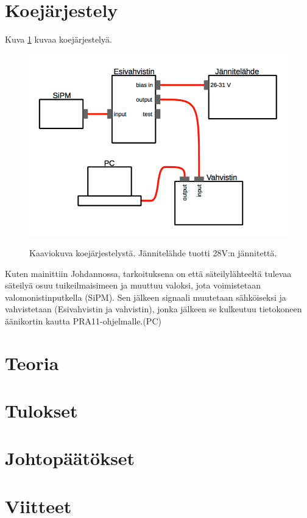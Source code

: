 \documentclass[a4paper, 12pt]{article}
\begin{document}
\section{Koejärjestely}

Kuva \ref{fig:Koejarjestely} kuvaa koejärjestelyä. 

\begin{figure}[!hbt]
\includegraphics[scale=0.7]{Koejarjestely}
\label{fig:Koejarjestely}
\caption{Kaaviokuva koejärjestelystä. Jännitelähde tuotti 28V:n jännitettä.}
\end{figure}

Kuten mainittiin Johdannossa, tarkoituksena on että säteilylähteeltä tulevaa säteilyä osuu tuikeilmaisimeen ja muuttuu valoksi, jota voimistetaan valomonistinputkella (SiPM). Sen jälkeen signaali muutetaan sähköiseksi ja vahvistetaan (Esivahvistin ja vahvistin), jonka jälkeen se kulkeutuu tietokoneen äänikortin kautta PRA11-ohjelmalle.(PC)

\section{Teoria}

\section{Tulokset}

\section{Johtopäätökset}

\section{Viitteet}
\end{document}
